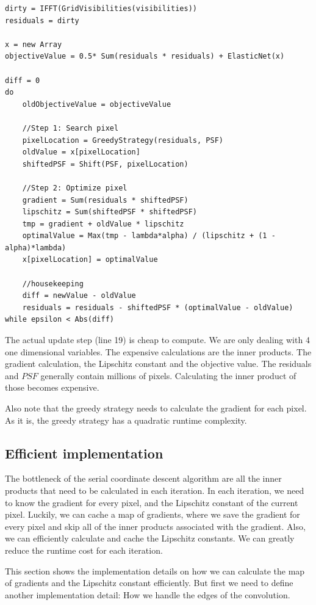 \begin{lstlisting}
dirty = IFFT(GridVisibilities(visibilities))
residuals = dirty

x = new Array
objectiveValue = 0.5* Sum(residuals * residuals) + ElasticNet(x)

diff = 0
do 
	oldObjectiveValue = objectiveValue
	
	//Step 1: Search pixel
	pixelLocation = GreedyStrategy(residuals, PSF)
	oldValue = x[pixelLocation]
	shiftedPSF = Shift(PSF, pixelLocation)
	
	//Step 2: Optimize pixel
	gradient = Sum(residuals * shiftedPSF)
	lipschitz = Sum(shiftedPSF * shiftedPSF)
	tmp = gradient + oldValue * lipschitz 
	optimalValue = Max(tmp - lambda*alpha) / (lipschitz + (1 - alpha)*lambda)
	x[pixelLocation] = optimalValue

	//housekeeping
	diff = newValue - oldValue
	residuals = residuals - shiftedPSF * (optimalValue - oldValue)
while epsilon < Abs(diff) 
\end{lstlisting}

The actual update step (line 19) is cheap to compute. We are only dealing with 4 one dimensional variables. The expensive calculations are the inner products. The gradient calculation, the Lipschitz constant and the objective value. The residuals and $PSF$ generally contain millions of pixels. Calculating the inner product of those becomes expensive. 

Also note that the greedy strategy needs to calculate the gradient for each pixel. As it is, the greedy strategy has a quadratic runtime complexity. 


\subsection{Efficient implementation}\label{cd:efficient}
The bottleneck of the serial coordinate descent algorithm are all the inner products that need to be calculated in each iteration. In each iteration, we need to know the gradient for every pixel, and the Lipschitz constant of the current pixel. Luckily, we can cache a map of gradients, where we save the gradient for every pixel and skip all of the inner products associated with the gradient. Also, we can efficiently calculate and cache the Lipschitz constants. We can greatly reduce the runtime cost for each iteration.

This section shows the implementation details on how we can calculate the map of gradients and the Lipschitz constant efficiently. But first we need to define another implementation detail: How we handle the edges of the convolution.

